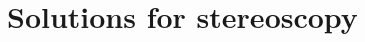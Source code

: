 
\iffalse
\section{Camera modelling fundamentals in computer vision}

\subsection{Pinhole camera}
\subsubsection{intrinsic parameters}

\subsection{Lens distortion correction and camera calibration}
\subsubsection{distortion parameters}
\subsubsection{extrinsic parameters}

\subsection{Fish-eye camera}
\fi

\section{Solutions for stereoscopy}

